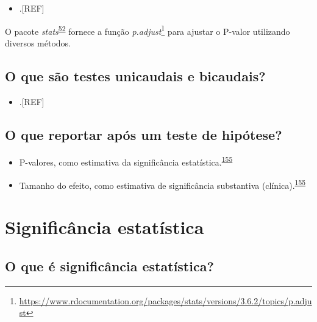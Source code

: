 \documentclass[
  a4paper,
]{book}
\providecommand{\tightlist}{%
  \setlength{\itemsep}{0pt}\setlength{\parskip}{0pt}}
\renewcommand{\href}[2]{#2\footnote{\url{#1}}}
\newenvironment{infobox}[1]
  {
  \begin{itemize}
  \renewcommand{\labelitemi}{
    \raisebox{-.7\height}[0pt][0pt]{
      {\setkeys{Gin}{width=3em,keepaspectratio}
        \texttt{[image: \#1]}}
    }
  }
  \setlength{\fboxsep}{1em}
  \begin{blackbox}
  \item
  }
  {
  \end{blackbox}
  \end{itemize}
  }
\begin{document}
\begin{itemize}
\tightlist
\item
  .{[}REF{]}
\end{itemize}

\begin{infobox}{images/Rlogo}
O pacote \emph{stats}\textsuperscript{\protect\hyperlink{ref-stats-2}{52}} fornece a função \href{https://www.rdocumentation.org/packages/stats/versions/3.6.2/topics/p.adjust}{\emph{p.adjust}} para ajustar o P-valor utilizando diversos métodos.

\end{infobox}

\hypertarget{o-que-suxe3o-testes-unicaudais-e-bicaudais}{%
\subsection{O que são testes unicaudais e bicaudais?}\label{o-que-suxe3o-testes-unicaudais-e-bicaudais}}

\begin{itemize}
\tightlist
\item
  .{[}REF{]}
\end{itemize}

\hypertarget{o-que-reportar-apuxf3s-um-teste-de-hipuxf3tese}{%
\subsection{O que reportar após um teste de hipótese?}\label{o-que-reportar-apuxf3s-um-teste-de-hipuxf3tese}}

\begin{itemize}
\item
  P-valores, como estimativa da significância estatística.\textsuperscript{\protect\hyperlink{ref-Sullivan2012}{155}}
\item
  Tamanho do efeito, como estimativa de significância substantiva (clínica).\textsuperscript{\protect\hyperlink{ref-Sullivan2012}{155}}
\end{itemize}

\hypertarget{significancia-estatistica}{%
\section{Significância estatística}\label{significancia-estatistica}}

\hypertarget{o-que-uxe9-significuxe2ncia-estatuxedstica}{%
\subsection{O que é significância estatística?}\label{o-que-uxe9-significuxe2ncia-estatuxedstica}}
\end{document}
